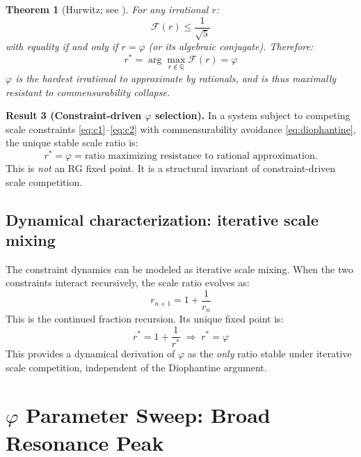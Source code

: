 \documentclass[11pt,a4paper]{article}
\theoremstyle{plain}
\newtheorem{theorem}{Theorem}[section]
\theoremstyle{definition}
\newcommand{\phiGolden}{\varphi}
\begin{document}
\begin{theorem}[Hurwitz; see \citealp{hurwitz1891}]
For any irrational $r$:
\begin{equation}
\mathcal{F}(r) \leq \frac{1}{\sqrt{5}}
\end{equation}
with equality if and only if $r = \phiGolden$ (or its algebraic
conjugate). Therefore:
\begin{equation}
\label{eq:phi_optimal}
r^* = \arg\max_{r \notin \mathbb{Q}} \mathcal{F}(r) = \phiGolden
\end{equation}
$\phiGolden$ is the \emph{hardest} irrational to approximate by
rationals, and is thus maximally resistant to commensurability collapse.
\end{theorem}

\begin{keybox}
\textbf{Result 3 (Constraint-driven $\phiGolden$ selection).}
In a system subject to competing scale constraints
\eqref{eq:c1}--\eqref{eq:c2} with commensurability avoidance
\eqref{eq:diophantine}, the unique stable scale ratio is:
\[
r^* = \phiGolden = \text{ratio maximizing resistance to rational
approximation}.
\]
This is \emph{not} an RG fixed point. It is a structural invariant
of constraint-driven scale competition.
\end{keybox}

\subsection{Dynamical characterization: iterative scale mixing}

The constraint dynamics can be modeled as iterative scale mixing.
When the two constraints interact recursively, the scale ratio evolves as:
\begin{equation}
r_{n+1} = 1 + \frac{1}{r_n}
\end{equation}
This is the continued fraction recursion. Its unique fixed point is:
\begin{equation}
r^* = 1 + \frac{1}{r^*} \;\Longrightarrow\; r^* = \phiGolden
\end{equation}
This provides a dynamical derivation of $\phiGolden$ as the
\emph{only} ratio stable under iterative scale competition, independent
of the Diophantine argument.

\section{$\phiGolden$ Parameter Sweep: Broad Resonance Peak}
\label{sec:phi_sweep}
\end{document}
